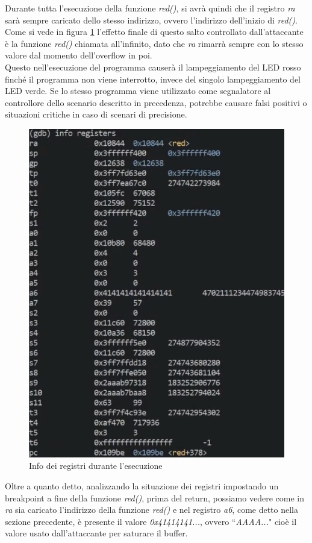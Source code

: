 Durante tutta l'esecuzione della funzione \textit{red()}, si avrà quindi che il registro \textit{ra} sarà sempre caricato dello stesso indirizzo, ovvero l'indirizzo dell'inizio di \textit{red()}. Come si vede in figura \ref{ref:ra_milkv} l'effetto finale di questo salto controllato dall'attaccante è la funzione \textit{red()} chiamata all'infinito, dato che \textit{ra} rimarrà sempre con lo stesso valore dal momento dell'overflow in poi.\\
Questo nell'esecuzione del programma causerà il lampeggiamento del LED rosso finché il programma non viene interrotto, invece del singolo lampeggiamento del LED verde. Se lo stesso programma viene utilizzato come segnalatore al controllore dello scenario descritto in precedenza, potrebbe causare falsi positivi o situazioni critiche in caso di scenari di precisione.
\FloatBarrier
\vspace{1cm}
\begin{figure}[!htbp]
    \centering
    \includegraphics[width=0.65\linewidth]{images/ra-milkv.png}
    \caption{Info dei registri durante l'esecuzione}
    \label{ref:ra_milkv}
\end{figure}
\vspace{1cm}
\FloatBarrier
Oltre a quanto detto, analizzando la situazione dei registri impostando un breakpoint a fine della funzione \textit{red()}, prima del return, possiamo vedere come in \textit{ra} sia caricato l'indirizzo della funzione \textit{red()} e nel registro \textit{a6}, come detto nella sezione precedente, è presente il valore \textit{0x41414141...}, ovvero ``\textit{AAAA...}" cioè il valore usato dall'attaccante per saturare il buffer.\\
